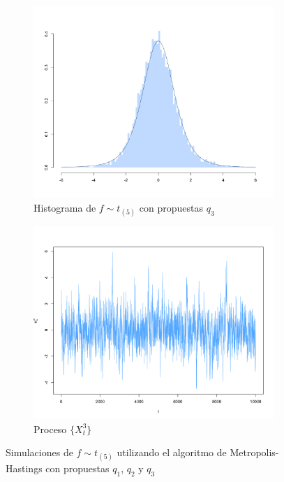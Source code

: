 \documentclass[11pt,a4paper]{article}
\begin{document}
\begin{figure}[!p]
     \vspace{0.2cm}
    
    \begin{subfigure}[t]{0.45\textwidth}
        \centering
        \includegraphics[width=\linewidth]{mh_hist_x3.png} 
        \caption{Histograma de $f \sim t_{(5)}$ con propuestas $q_3$} \label{fig:mh_hist_x3}
    \end{subfigure}
    \hfill
    \begin{subfigure}[t]{0.45\textwidth}
        \centering
        \includegraphics[width=\linewidth]{mh_chain_x3.png} 
        \caption{Proceso $\lbrace X_t^3 \rbrace$} \label{fig:mh_chain_x3}
    \end{subfigure}
    
    \caption{Simulaciones de $f \sim t_{(5)}$ utilizando el algoritmo de Metropolis-Hastings con propuestas $q_1$, $q_2$ y $q_3$}
    \label{fig:mh_t}
\end{figure}
\end{document}
